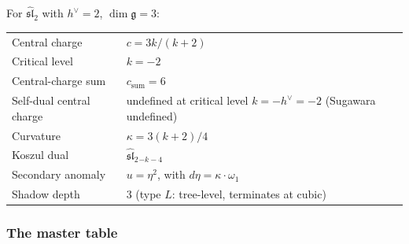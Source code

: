 \begin{computation}
For $\widehat{\mathfrak{sl}}_2$ with $h^\vee = 2$,
$\dim\mathfrak{g} = 3$:
\begin{center}
\renewcommand{\arraystretch}{1.2}
\begin{tabular}{ll}
Central charge & $c = 3k/(k+2)$ \\
Critical level & $k = -2$ \\
Central-charge sum & $c_{\mathrm{sum}} = 6$ \\
Self-dual central charge & undefined at critical level $k = -h^\vee = -2$ (Sugawara undefined) \\
Curvature & $\kappa = 3(k+2)/4$ \\
Koszul dual & $\widehat{\mathfrak{sl}}_2{}_{-k-4}$ \\
Secondary anomaly & $u = \eta^2$, with $d\eta = \kappa \cdot \omega_1$ \\
Shadow depth & $3$ (type $L$: tree-level, terminates at cubic)
\end{tabular}
\end{center}
\end{computation}

\subsubsection{The master table}

